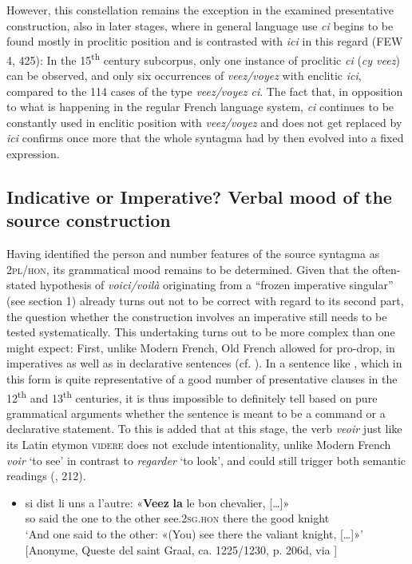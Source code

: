 \documentclass[output=paper]{langscibook}
\begin{document}
\begin{itemize}
\begin{itemize}
\begin{itemize}
\begin{itemize}
\begin{itemize}
\begin{itemize}
\begin{itemize}
\begin{itemize}
\begin{itemize}
However, this constellation remains the exception in the examined presentative construction, also in later stages, where in general language use \textit{ci} begins to be found mostly in proclitic position and is contrasted with \textit{ici} in this regard (FEW 4, 425): In the 15\textsuperscript{th} century subcorpus, only one instance of proclitic \textit{ci} (\textit{cy veez}) can be observed, and only six occurrences of \textit{veez/voyez} with enclitic \textit{ici}, compared to the 114 cases of the type \textit{veez/voyez ci}. The fact that, in opposition to what is happening in the regular French language system, \textit{ci} continues to be constantly used in enclitic position with \textit{veez/voyez} and does not get replaced by \textit{ici} confirms once more that the whole syntagma had by then evolved into a fixed expression.

\subsection{Indicative or Imperative? Verbal mood of the source construction}

Having identified the person and number features of the source syntagma as \textsc{2pl/hon}, its grammatical mood remains to be determined. Given that the often-stated hypothesis of \textit{voici/voilà} originating from a “frozen imperative singular” (see section 1) already turns out not to be correct with regard to its second part, the question whether the construction involves an imperative still needs to be tested systematically. This undertaking turns out to be more complex than one might expect: First, unlike Modern French, Old French allowed for pro-drop, in imperatives as well as in declarative sentences (cf. \citealt{Adams1987}). In a sentence like , which in this form is quite representative of a good number of presentative clauses in the 12\textsuperscript{th} and 13\textsuperscript{th} centuries, it is thus impossible to definitely tell based on pure grammatical arguments whether the sentence is meant to be a command or a declarative statement. To this is added that at this stage, the verb \textit{veoir} just like its Latin etymon \textsc{videre} does not exclude intentionality, unlike Modern French \textit{voir} ‘to see’ in contrast to \textit{regarder} ‘to look’, and could still trigger both semantic readings (\citealt{Iliescu2010}, 212). 

\begin{itemize}
\item \gll si dist li uns a l'autre: «\textbf{Veez} \textbf{la} le bon chevalier, […]»\\
     so said the one to the other see.\textsc{2sg.hon} there the good knight\\
\glt ‘And one said to the other: «(You) see there the valiant knight, […]»’ [Anonyme, Queste del saint Graal, ca. 1225/1230, p. 206d, via \citealt{BFM2022}]
\z %


\end{itemize}
\end{itemize}
\end{itemize}
\end{itemize}
\end{itemize}
\end{itemize}
\end{itemize}
\end{itemize}
\end{itemize}
\end{itemize}
\end{document}
